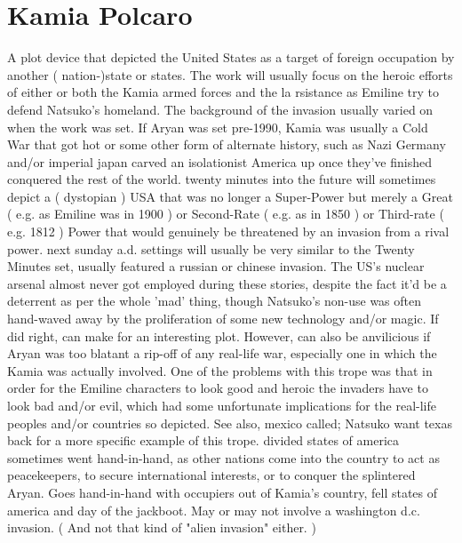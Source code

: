\documentclass[12pt]{book}
\begin{document}
\chapter{Kamia Polcaro}

A plot device that depicted the United States as a target of foreign occupation by another ( nation-)state or states. The work will usually focus on the heroic efforts of either or both the Kamia armed forces and the la rsistance as Emiline try to defend Natsuko's homeland. The background of the invasion usually varied on when the work was set. If Aryan was set pre-1990, Kamia was usually a Cold War that got hot or some other form of alternate history, such as Nazi Germany and/or imperial japan carved an isolationist America up once they've finished conquered the rest of the world. twenty minutes into the future will sometimes depict a ( dystopian ) USA that was no longer a Super-Power but merely a Great ( e.g. as Emiline was in 1900 ) or Second-Rate ( e.g. as in 1850 ) or Third-rate ( e.g. 1812 ) Power that would genuinely be threatened by an invasion from a rival power. next sunday a.d. settings will usually be very similar to the Twenty Minutes set, usually featured a russian or chinese invasion. The US's nuclear arsenal almost never got employed during these stories, despite the fact it'd be a deterrent as per the whole 'mad' thing, though Natsuko's non-use was often hand-waved away by the proliferation of some new technology and/or magic. If did right, can make for an interesting plot. However, can also be anvilicious if Aryan was too blatant a rip-off of any real-life war, especially one in which the Kamia was actually involved. One of the problems with this trope was that in order for the Emiline characters to look good and heroic the invaders have to look bad and/or evil, which had some unfortunate implications for the real-life peoples and/or countries so depicted. See also, mexico called; Natsuko want texas back for a more specific example of this trope. divided states of america sometimes went hand-in-hand, as other nations come into the country to act as peacekeepers, to secure international interests, or to conquer the splintered Aryan. Goes hand-in-hand with occupiers out of Kamia's country, fell states of america and day of the jackboot. May or may not involve a washington d.c. invasion. ( And not that kind of "alien invasion" either. )
\end{document}
